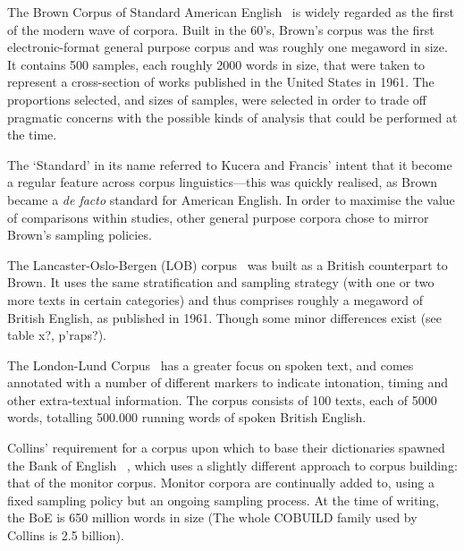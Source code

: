 The Brown Corpus of Standard American English~\cite{francis1961brown}%
is widely regarded as the first of the modern wave of corpora.  Built in the 60's, Brown's corpus was the first electronic-format general purpose corpus and was roughly one megaword in size.%
It contains 500 samples, each roughly 2000 words in size, that were taken to represent a cross-section of works published in the United States in 1961.  The proportions selected, and sizes of samples, were selected in order to trade off pragmatic concerns with the possible kinds of analysis that could be performed at the time.

The `Standard' in its name referred to Kucera and Francis' intent that it become a regular feature across corpus linguistics---this was quickly realised, as Brown became a \textsl{de facto} standard for American English.  In order to maximise the value of comparisons within studies, other general purpose corpora chose to mirror Brown's sampling policies.


The Lancaster-Oslo-Bergen (LOB) corpus~\cite{johansson1986tagged} was built as a British counterpart to Brown.  
It uses the same stratification and sampling strategy (with one or two more texts in certain categories) and thus comprises roughly a megaword of British English, as published in 1961.  %
Though some minor differences exist (see table x?, p'raps?).


The London-Lund Corpus~\cite{greenbaum1990london} has a greater focus on spoken text, and comes annotated with a number of different markers to indicate intonation, timing and other extra-textual information.  
The corpus consists of 100 texts, each of 5000 words, totalling 500.000 running words of spoken British English.



Collins' requirement for a corpus upon which to base their dictionaries spawned the Bank of English~\cite{Jarvinen1994AMW991886.991985}
, which uses a slightly different approach to corpus building: that of the monitor corpus.  Monitor corpora are continually added to, using a fixed sampling policy but an ongoing sampling process.  At the time of writing, the BoE is 650 million words in size (The whole COBUILD family used by Collins is 2.5 billion).

